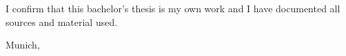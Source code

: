 %
\thispagestyle{empty}

\vspace*{0.8\textheight}
\noindent
I confirm that this bachelor's thesis is my own work and I have documented all sources and material used.

\vspace{15mm}
\noindent
Munich, \thesisDate {} \thesisAuthor

\newpage


